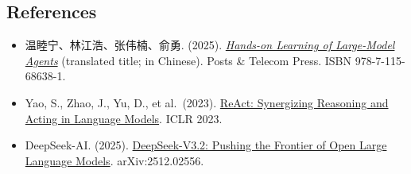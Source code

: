 \FloatBarrier
{}
\hypertarget{references-122}{%
\subsection{References}\label{references-122}}

\vspace{0.25em}
\begin{itemize}
\tightlist
\item
  温睦宁、林江浩、张伟楠、俞勇. (2025). \href{https://haa.boyuai.com/}{\emph{Hands-on Learning of Large-Model Agents}} (translated title; in Chinese). Posts \& Telecom Press. ISBN 978-7-115-68638-1.
\item
  Yao, S., Zhao, J., Yu, D., et al.~(2023). \href{https://arxiv.org/abs/2210.03629}{ReAct: Synergizing Reasoning and Acting in Language Models}. ICLR 2023.
\item
  DeepSeek-AI. (2025). \href{https://arxiv.org/abs/2512.02556}{DeepSeek-V3.2: Pushing the Frontier of Open Large Language Models}. arXiv:2512.02556.
\end{itemize}

\clearpage
